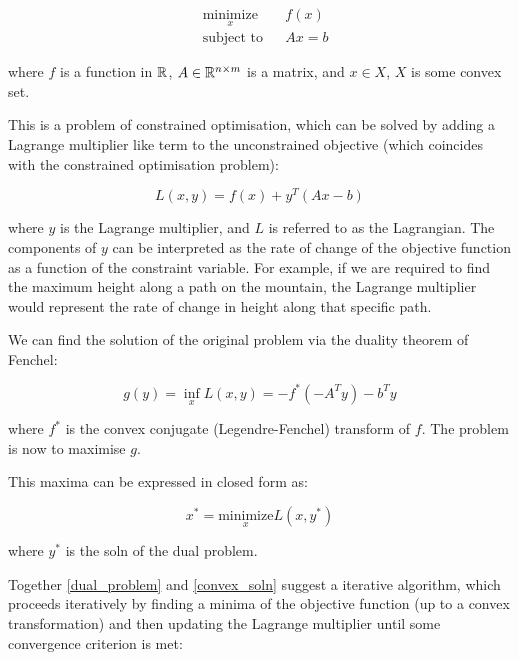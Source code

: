 \documentclass{article}
\begin{document}
\begin{equation*}
\begin{aligned}
& \underset{x}{\text{minimize}}
& & f\left( x \right) \\
& \text{subject to}
& & Ax = b
\label{orig_problem}
\end{aligned}
\end{equation*}

where \(f\) is a function in \({\mathbb{R}}\), \(A \in {\mathbb{R}}^{n \times m}\) is a matrix, and \(x\in X\), \(X\) is some convex set.

This is a problem of constrained optimisation, which can be solved by adding a Lagrange multiplier like term to the unconstrained objective (which coincides with the constrained optimisation problem): 

\begin{equation}
L\left(x,y\right) = f\left( x \right) + y^T\left(Ax-b\right)
\end{equation}

where \(y\) is the Lagrange multiplier, and \(L\) is referred to as the Lagrangian. The components of \(y\) can be interpreted as the rate of change of the objective function as a function of the constraint variable. For example, if we are required to find the maximum height along a path on the mountain, the Lagrange multiplier would represent the rate of change in height along that specific path. 

We can find the solution of the original problem via the duality theorem of Fenchel:

\begin{equation}
g\left(y\right) = \inf_x L\left(x,y\right) = -f^*\left(-A^Ty\right) -b^Ty
\label{dual_problem}
\end{equation}

where \(f^*\) is the convex conjugate (Legendre-Fenchel) transform of \(f\). The problem is now to maximise \(g\). 

This maxima can be expressed in closed form as:

\begin{equation}
x^* = \underset{x}{\text{minimize}} L\left(x, y^*\right) 
\label{convex_soln}
\end{equation}

where \(y^*\) is the soln of the dual problem. 

Together \ref{dual_problem} and \ref{convex_soln} suggest a iterative algorithm, which proceeds iteratively by finding a minima of the objective function (up to a convex transformation) and then updating the Lagrange multiplier until some convergence criterion is met: 
\end{document}
